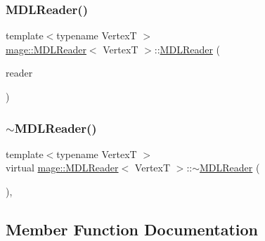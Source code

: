 \subsubsection{\texorpdfstring{M\+D\+L\+Reader()}{MDLReader()}\hspace{0.1cm}{\footnotesize\ttfamily [3/3]}}
{\footnotesize\ttfamily template$<$typename VertexT $>$ \\
\hyperlink{classmage_1_1_m_d_l_reader}{mage\+::\+M\+D\+L\+Reader}$<$ VertexT $>$\+::\hyperlink{classmage_1_1_m_d_l_reader}{M\+D\+L\+Reader} (\begin{DoxyParamCaption}\item[{\hyperlink{classmage_1_1_m_d_l_reader}{M\+D\+L\+Reader}$<$ VertexT $>$ \&\&}]{reader }\end{DoxyParamCaption})\hspace{0.3cm}{\ttfamily [delete]}}

\hypertarget{classmage_1_1_m_d_l_reader_a2da322d25dee1198ceb3c9455e5a51bf}{}\label{classmage_1_1_m_d_l_reader_a2da322d25dee1198ceb3c9455e5a51bf} 
\subsubsection{\texorpdfstring{$\sim$\+M\+D\+L\+Reader()}{~MDLReader()}}
{\footnotesize\ttfamily template$<$typename VertexT $>$ \\
virtual \hyperlink{classmage_1_1_m_d_l_reader}{mage\+::\+M\+D\+L\+Reader}$<$ VertexT $>$\+::$\sim$\hyperlink{classmage_1_1_m_d_l_reader}{M\+D\+L\+Reader} (\begin{DoxyParamCaption}{ }\end{DoxyParamCaption})\hspace{0.3cm}{\ttfamily [virtual]}, {\ttfamily [default]}}



\subsection{Member Function Documentation}
\hypertarget{classmage_1_1_m_d_l_reader_aa814a809bb990d0b51456697d84a3a35}{}\label{classmage_1_1_m_d_l_reader_aa814a809bb990d0b51456697d84a3a35} 
